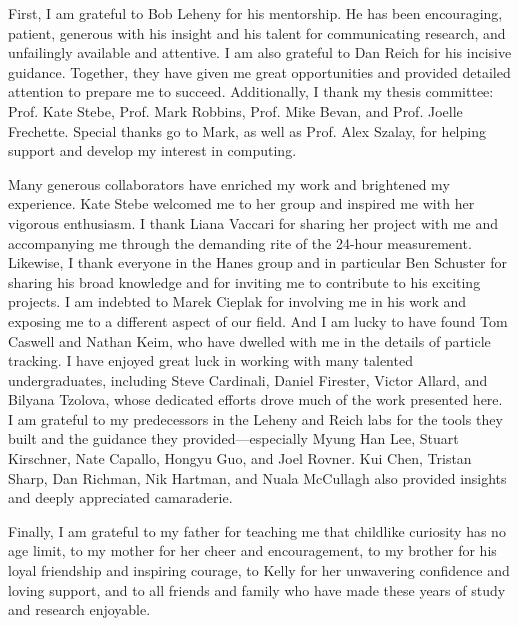\begin{frontmatter}
\begin{acknowledgment}

First, I am grateful to Bob Leheny for his mentorship. He has been encouraging, patient, generous with his insight and his talent for communicating research, and unfailingly available and attentive. I am also grateful to Dan Reich for his incisive guidance. Together, they have given me great opportunities and provided detailed attention to prepare me to succeed. Additionally, I thank my thesis committee: Prof. Kate Stebe, Prof. Mark Robbins, Prof. Mike Bevan, and Prof. Joelle Frechette. Special thanks go to Mark, as well as Prof. Alex Szalay, for helping support and develop my interest in computing.

Many generous collaborators have enriched my work and brightened my experience. Kate Stebe welcomed me to her group and inspired me with her vigorous enthusiasm. I thank Liana Vaccari for sharing her project with me and accompanying me through the demanding rite of the 24-hour measurement. Likewise, I thank everyone in the Hanes group and in particular Ben Schuster for sharing his broad knowledge and for inviting me to contribute to his exciting projects. I am indebted to Marek Cieplak for involving me in his work and exposing me to a different aspect of our field. And I am lucky to have found Tom Caswell and Nathan Keim, who have dwelled with me in the details of particle tracking. I have enjoyed great luck in working with many talented undergraduates, including Steve Cardinali, Daniel Firester, Victor Allard, and Bilyana Tzolova, whose dedicated efforts drove much of the work presented here. I am grateful to my predecessors in the Leheny and Reich labs for the tools they built and the guidance they provided---especially Myung Han Lee, Stuart Kirschner, Nate Capallo, Hongyu Guo, and Joel Rovner. Kui Chen, Tristan Sharp, Dan Richman, Nik Hartman, and Nuala McCullagh also provided insights and deeply appreciated camaraderie.

Finally, I am grateful to my father for teaching me that childlike curiosity has no age limit, to my mother for her cheer and encouragement, to my brother for his loyal friendship and inspiring courage, to Kelly for her unwavering confidence and loving support, and to all friends and family who have made these years of study and research enjoyable.

\end{acknowledgment}

\tableofcontents


\listoffigures

\end{frontmatter}
